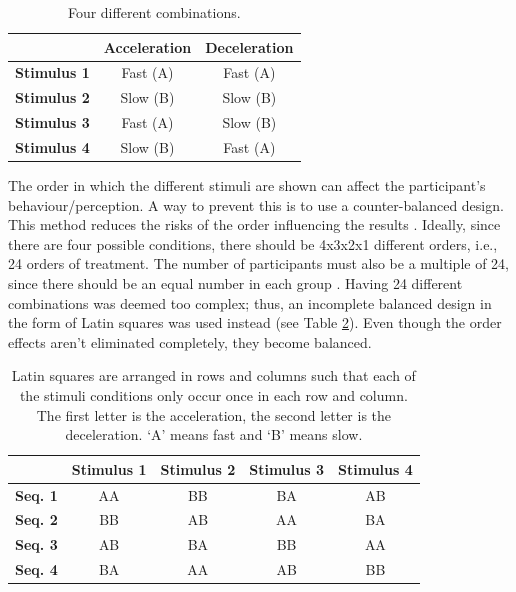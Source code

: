 \begin{table} \centering
\caption{Four different combinations.}
\label{tab:combinations}
\begin{tabular}{ccc}
\toprule
& \textbf{Acceleration} & \textbf{Deceleration} \\
\midrule
\textbf{Stimulus 1} & Fast (A) & Fast (A)\\
\textbf{Stimulus 2} & Slow (B) & Slow (B)\\
\textbf{Stimulus 3} & Fast (A) & Slow (B)\\
\textbf{Stimulus 4} & Slow (B) & Fast (A)\\
\bottomrule
\end{tabular}
\end{table}

The order in which the different stimuli are shown can affect the participant's behaviour/perception. A way to prevent this is to use a counter-balanced design. This method reduces the risks of the order influencing the results \cite{experimental2}. Ideally, since there are four possible conditions, there should be 4x3x2x1 different orders, i.e., 24 orders of treatment. The number of participants must also be a multiple of 24, since there should be an equal number in each group \cite{experimental2}. Having 24 different combinations was deemed too complex; thus, an incomplete balanced design in the form of Latin squares was used instead (see Table \ref{table:latin}). Even though the order effects aren't eliminated completely, they become balanced.

\begin{table} \centering
\scriptsize
\caption{Latin squares are arranged in rows and columns such that each of the stimuli conditions only occur once in each row and column. The first letter is the acceleration, the second letter is the deceleration. `A' means fast and `B' means slow.}
\label{table:latin}
\begin{tabular}{ccccc}
\toprule
& \textbf{Stimulus 1} & \textbf{Stimulus 2} & \textbf{Stimulus 3} & \textbf{Stimulus 4}\\
\midrule
\textbf{Seq. 1} & AA & BB & BA & AB\\
\textbf{Seq. 2} & BB & AB & AA & BA\\
\textbf{Seq. 3} & AB & BA & BB & AA\\
\textbf{Seq. 4} & BA & AA & AB & BB\\
\bottomrule
\end{tabular}
\end{table}

